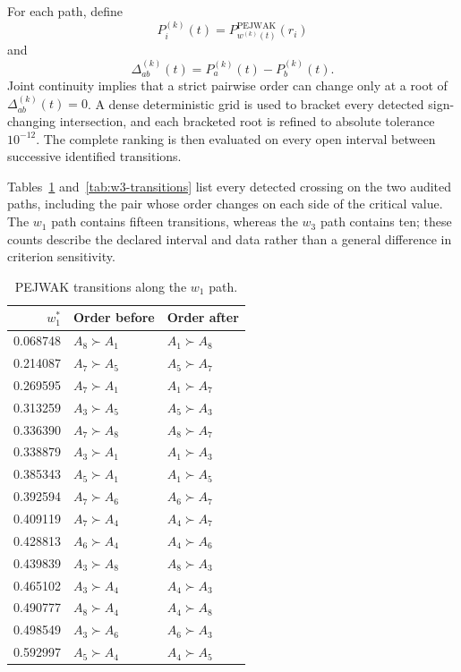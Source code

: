 \documentclass[reqno,11pt]{amsart}
\theoremstyle{definition}
\theoremstyle{plain}
\theoremstyle{remark}
\begin{document}
For each path, define
\[
P_i^{(k)}(t)=P_{w^{(k)}(t)}^{\mathrm{PEJWAK}}(r_i)
\]
and
\[
\Delta_{ab}^{(k)}(t)=P_a^{(k)}(t)-P_b^{(k)}(t).
\]
Joint continuity implies that a strict pairwise order can change only at a root of $\Delta_{ab}^{(k)}(t)=0$. A dense deterministic grid is used to bracket every detected sign-changing intersection, and each bracketed root is refined to absolute tolerance $10^{-12}$. The complete ranking is then evaluated on every open interval between successive identified transitions.

Tables~\ref{tab:w1-transitions} and~\ref{tab:w3-transitions} list every detected crossing on the two audited paths, including the pair whose order changes on each side of the critical value. The $w_1$ path contains fifteen transitions, whereas the $w_3$ path contains ten; these counts describe the declared interval and data rather than a general difference in criterion sensitivity.

\begin{table}[htbp]
\centering
\scriptsize
\caption{PEJWAK transitions along the $w_1$ path.}
\label{tab:w1-transitions}
\begin{tabular}{rll}
\toprule
$w_1^*$ & Order before & Order after\\
\midrule
0.068748 & $A_8\succ A_1$ & $A_1\succ A_8$\\
0.214087 & $A_7\succ A_5$ & $A_5\succ A_7$\\
0.269595 & $A_7\succ A_1$ & $A_1\succ A_7$\\
0.313259 & $A_3\succ A_5$ & $A_5\succ A_3$\\
0.336390 & $A_7\succ A_8$ & $A_8\succ A_7$\\
0.338879 & $A_3\succ A_1$ & $A_1\succ A_3$\\
0.385343 & $A_5\succ A_1$ & $A_1\succ A_5$\\
0.392594 & $A_7\succ A_6$ & $A_6\succ A_7$\\
0.409119 & $A_7\succ A_4$ & $A_4\succ A_7$\\
0.428813 & $A_6\succ A_4$ & $A_4\succ A_6$\\
0.439839 & $A_3\succ A_8$ & $A_8\succ A_3$\\
0.465102 & $A_3\succ A_4$ & $A_4\succ A_3$\\
0.490777 & $A_8\succ A_4$ & $A_4\succ A_8$\\
0.498549 & $A_3\succ A_6$ & $A_6\succ A_3$\\
0.592997 & $A_5\succ A_4$ & $A_4\succ A_5$\\
\bottomrule
\end{tabular}
\end{table}
\end{document}
